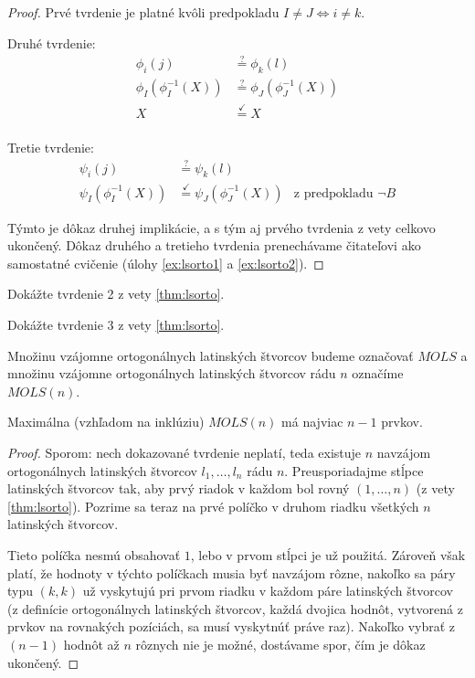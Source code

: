 \begin{proof}
Prvé tvrdenie je platné kvôli predpokladu $I \neq J \Longleftrightarrow i \neq k$.

Druhé tvrdenie:
\begin{align*}
\phi_i(j) &\overset{?}{=} \phi_k(l)\\
\phi_I(\phi_I^{-1}(X)) &\overset{?}{=} \phi_J(\phi_J^{-1}(X))\\
X &\overset{\checkmark}{=} X\\
\end{align*}

Tretie tvrdenie:
\begin{align*}
\psi_i(j) &\overset{?}{=} \psi_k(l)\\
\psi_I(\phi_I^{-1}(X)) &\overset{\checkmark}{=} \psi_J(\phi_J^{-1}(X))&\text{z predpokladu $\neg B$}
\end{align*}

Týmto je dôkaz druhej implikácie, a s tým aj prvého tvrdenia z vety celkovo ukončený.
Dôkaz druhého a tretieho tvrdenia prenechávame čitateľovi ako samostatné cvičenie (úlohy \ref{ex:lsorto1} a \ref{ex:lsorto2}).
\end{proof}

\begin{exercise}
\label{ex:lsorto1}
Dokážte tvrdenie 2 z vety \ref{thm:lsorto}.
\end{exercise}

\begin{exercise}
\label{ex:lsorto2}
Dokážte tvrdenie 3 z vety \ref{thm:lsorto}.
\end{exercise}




\begin{definition}
Množinu vzájomne ortogonálnych latinských štvorcov budeme označovať $MOLS$ a množinu vzájomne ortogonálnych latinských štvorcov rádu $n$ označíme $MOLS(n)$.
\end{definition}

\begin{theorem}
Maximálna (vzhľadom na inklúziu) $MOLS(n)$ má najviac $n-1$ prvkov.
\end{theorem}


\begin{proof}
Sporom: nech dokazované tvrdenie neplatí, teda existuje $n$ navzájom ortogonálnych latinských štvorcov $l_1, \ldots, l_n$ rádu $n$.
Preusporiadajme stĺpce latinských štvorcov tak, aby prvý riadok v každom bol rovný $(1, \ldots, n)$ (z vety \ref{thm:lsorto}).
Pozrime sa teraz na prvé políčko v druhom riadku všetkých $n$ latinských štvorcov.

Tieto políčka nesmú obsahovať $1$, lebo v prvom stĺpci je už použitá.
Zároveň však platí, že hodnoty v týchto políčkach musia byť navzájom rôzne, nakoľko sa páry typu $(k, k)$ už vyskytujú pri prvom riadku v každom páre latinských štvorcov (z definície ortogonálnych latinských štvorcov, každá dvojica hodnôt, vytvorená z prvkov na rovnakých pozíciách, sa musí vyskytnúť práve raz).
Nakoľko vybrať z $(n-1)$ hodnôt až $n$ rôznych nie je možné, dostávame spor, čím je dôkaz ukončený.
\end{proof}


